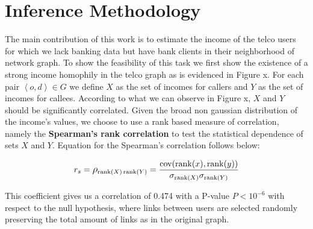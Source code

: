 \section{Inference Methodology}






The main contribution of this work is to estimate the income of the telco users for which we lack banking data but have bank clients in their neighborhood of network graph. To show the feasibility of this task we first show the existence of a strong income homophily in the telco graph as is evidenced in Figure x. For each pair \( \left< o, d \right> \in G \) we define \( X \) as the set of incomes for callers and \( Y \) as the set of incomes for callees. According to what we can observe in Figure x, \( X \) and \( Y \) should be significantly correlated. Given the broad non gaussian distribution of the income's values, we choose to use a rank based measure of correlation, namely the \textbf{Spearman's rank correlation} to test the statistical dependence of sets \( X \) and \( Y \). Equation for the Spearman's correlation follows below: 

\[
r_s = \mathlarger{\rho}_{\operatorname{rank}(X) \operatorname{rank}(Y)} = \frac{\operatorname{cov}(\operatorname{rank}(x), \operatorname{rank}(y))}{\sigma_{\operatorname{rank}(X)} \sigma_{\operatorname{rank}(Y)}}
\]

This coefficient gives us a correlation of \num{0.474} with a P-value $ P < 10^{-6} $  with respect to the null hypothesis, where links between users are selected randomly preserving the total amount of links as in the original graph.

